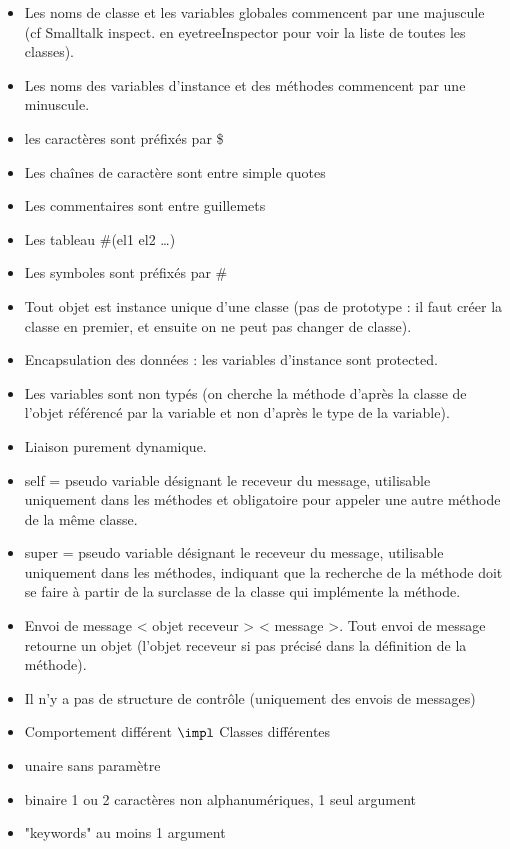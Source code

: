 \begin{itemize}
	\item Les noms de classe et les variables globales commencent par une majuscule (cf Smalltalk inspect. en eyetreeInspector pour voir la liste de toutes les classes).
	\item Les noms des variables d'instance et des méthodes commencent par une minuscule.
	\item les caractères sont préfixés par \$
	\item Les chaînes de caractère sont entre simple quotes
	\item Les commentaires sont entre guillemets
	\item Les tableau \#(el1 el2 \ldots)
	\item Les symboles sont préfixés par \#
\end{itemize}

\begin{itemize}
	\item Tout objet est instance unique d'une classe (pas de prototype : il faut créer la classe en premier, et ensuite on ne peut pas changer de classe).
	\item Encapsulation des données : les variables d'instance sont protected.
	\item Les variables sont non typés (on cherche la méthode d'après la classe de l'objet référencé par la variable et non d'après le type de la variable).
	\item Liaison purement dynamique.
	\item self = pseudo variable désignant le receveur du message, utilisable uniquement dans les méthodes et obligatoire pour appeler une autre méthode de la même classe.
	\item super = pseudo variable désignant le receveur du message, utilisable uniquement dans les méthodes, indiquant que la recherche de la méthode doit se faire à partir de la surclasse de la classe qui implémente la méthode.
	\item Envoi de message < objet receveur > < message >. Tout envoi de message retourne un objet (l'objet receveur si pas précisé dans la définition de la méthode).
	\item Il n'y a pas de structure de contrôle (uniquement des envois de messages)
	\item Comportement différent $\impl$ Classes différentes
\end{itemize}

\begin{itemize}
	\item unaire sans paramètre
	\item binaire 1 ou 2 caractères non alphanumériques, 1 seul argument
	\item "keywords" au moins 1 argument
\end{itemize}

